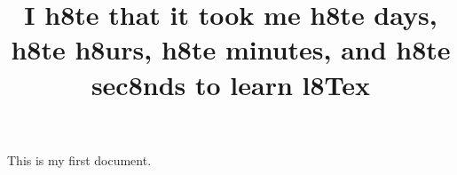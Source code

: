 \documentclass{article}
\title{I h8te that it took me h8te days, h8te h8urs, h8te minutes, and h8te sec8nds to learn l8Tex}
\author{}
\begin{document}
	\maketitle
	This is my first document. 
	
\end{document}

